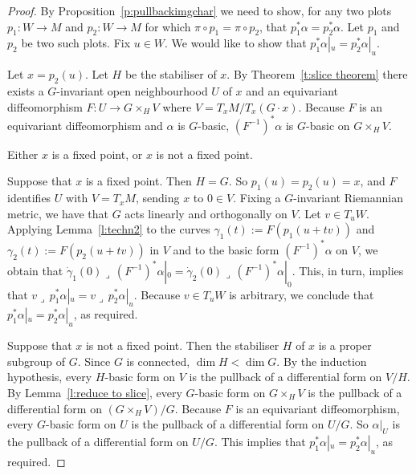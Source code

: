 \documentclass[11pt]{article}
\numberwithin{equation}{section}
\newcommand{\hook}{{\lrcorner\,}} %
\newcommand{\hypref}[2]{{#2~\ref{#1}}}
\begin{document}
\begin{proof}
By \hypref{p:pullbackimgchar}{Proposition} we need to show,
for any two plots $p_1 \colon W \to M$
and $p_2 \colon W\to M$ for which $\pi \circ p_1 = \pi \circ p_2$,
that $p_1^* \alpha = p_2^* \alpha$.
Let $p_1$ and $p_2$ be two such plots.
Fix $u\in W$. We would like to show that $p_1^*\alpha|_u = p_2^*\alpha|_u$.

Let $x = p_2(u)$. Let $H$ be the stabiliser of $x$.
By Theorem~\ref{t:slice theorem} %
there exists
a $G$-invariant open neighbourhood $U$ of $x$ and an equivariant
dif\/feomorphism $F \colon U \to G \times_H V$
where $V = T_xM / T_x(G \cdot x)$.
Because $F$ is an equivariant dif\/feomorphism and $\alpha$ is $G$-basic,
$(F^{-1})^* \alpha$ is $G$-basic on $G \times_H V$.

Either $x$ is a f\/ixed point, or $x$ is not a f\/ixed point.

Suppose that $x$ is a f\/ixed point. Then $H=G$.
So $p_1(u) = p_2(u) = x$, and $F$ identif\/ies $U$ with $V = T_xM$,
sending $x$ to $0 \in V$.
Fixing a $G$-invariant Riemannian metric, we have
that $G$ acts linearly and orthogonally on $V$. Let $v \in T_uW$. Applying \hypref{l:techn2}{Lemma} to the curves
$\gamma_1(t) := F(p_1(u+tv))$ and $\gamma_2(t) := F(p_2(u+tv))$ in $V$
and to the basic form $(F^{-1})^*\alpha$ on $V$,
we obtain that $\dot{\gamma}_1(0) \hook (F^{-1})^*\alpha|_0
 = \dot{\gamma}_2(0) \hook (F^{-1})^*\alpha|_0$.
This, in turn, implies that $v \hook p_1^*\alpha|_u = v \hook p_2^* \alpha|_u$.
Because $v \in T_uW$ is arbitrary, we conclude
that $p_1^*\alpha|_u = p_2^*\alpha|_u$, as required.

Suppose that $x$ is not a f\/ixed point.
Then the stabiliser $H$ of $x$ is a proper subgroup of $G$.
Since $G$ is connected, $\dim H < \dim G$.
By the induction hypothesis, every $H$-basic form on $V$
is the pullback of a dif\/ferential form on $V/H$.
By \hypref{l:reduce to slice}{Lemma},
every $G$-basic form on $G \times_H V$
is the pullback of a dif\/ferential form on $(G \times_H V)/G$.
Because $F$ is an equivariant dif\/feomorphism,
every $G$-basic form on $U$
is the pullback of a dif\/ferential form on $U/G$.
So $\alpha|_U$ is the pullback of a dif\/ferential form on $U/G$.
This implies that $p_1^* \alpha|_u = p_2^* \alpha|_u$, as required.
\end{proof}
\end{document}
